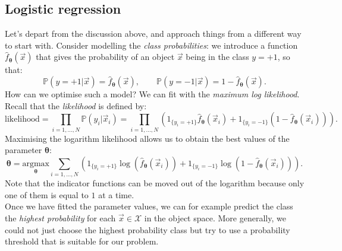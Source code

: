 \newpage
\subsection{Logistic regression}
Let's depart from the discussion above, and approach things from a different way to start with. Consider modelling the \textit{class probabilities}: we introduce a function $\hat{f}_{\pmb{\theta}}(\vec{x})$ that gives the probability of an object $\vec{x}$ being in the class $y=+1$, so that:
\begin{equation*}
\mathbb{P}(y=+1 | \vec{x}) = \hat{f}_{\pmb{\theta}}(\vec{x}), \qquad \mathbb{P}(y=-1 | \vec{x}) = 1 - \hat{f}_{\pmb{\theta}}(\vec{x}).
\end{equation*}
How can we optimise such a model? We can fit with the \textit{maximum log likelihood}.\\

Recall that the \textit{likelihood} is defined by:
\begin{equation*}
\text{likelihood} = \prod_{i=1,...,N} \mathbb{P}(y_i|\vec{x}_i) = \prod_{i=1,...,N} \left( 1_{\{y_i = +1\}} \hat{f}_{\pmb{\theta}}(\vec{x}_i) + 1_{\{y_i = -1\}} \left(1 - \hat{f}_{\pmb{\theta}}(\vec{x}_i) \right) \right).
\end{equation*}
Maximising the logarithm likelihood allows us to obtain the best values of the parameter $\pmb{\theta}$:
\begin{equation*}
\pmb{\theta} = \underset{\pmb{\theta}}{\textrm{argmax}} \sum_{i=1,...,N} \left( 1_{\{y_i = +1\}} \log\left(\hat{f}_{\pmb{\theta}}(\vec{x}_i) \right) + 1_{\{y_i = -1\}} \log\left( 1 - \hat{f}_{\pmb{\theta}}(\vec{x}_i) \right) \right).
\end{equation*}
Note that the indicator functions can be moved out of the logarithm because only one of them is equal to $1$ at a time.\\

Once we have fitted the parameter values, we can for example predict the class the \textit{highest probability} for each $\vec{x} \in \mathcal{X}$ in the object space. More generally, we could not just choose the highest probability class but try to use a probability threshold that is suitable for our problem.


\minirule

